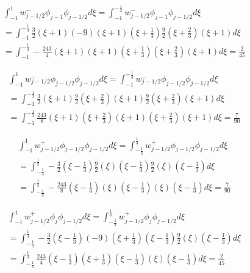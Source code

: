 \documentclass[12pt]{article}
\begin{document}
\begin{multline*}
\int_{-1}^{1} w^-_{j - 1/2} \phi_{j - 1} \phi_{j-1/2}d\xi  = \int_{-1}^{-\frac{1}{3}} w^-_{j - 1/2} \phi_{j - 1} \phi_{j-1/2}d\xi \\= \int_{-1}^{-\frac{1}{3}}  \frac{3}{2}\left(\xi + 1\right)(-9)\left(\xi + 1\right)\left(\xi + \frac{1}{3}\right) \frac{9}{2}\left(\xi + \frac{2}{3}\right)\left(\xi + 1\right) d\xi \\= \int_{-1}^{-\frac{1}{3}} -\frac{243}{4}\left(\xi + 1\right)\left(\xi + 1\right)\left(\xi + \frac{1}{3}\right)\left(\xi + \frac{2}{3}\right)\left(\xi + 1\right) d\xi  = \frac{2}{45}
\end{multline*}

\begin{multline*}
\int_{-1}^{1} w^-_{j - 1/2} \phi_{j - 1/2} \phi_{j-1/2}d\xi  = \int_{-1}^{-\frac{1}{3}} w^-_{j - 1/2} \phi_{j - 1/2} \phi_{j-1/2}d\xi \\= \int_{-1}^{-\frac{1}{3}}  \frac{3}{2}\left(\xi + 1\right)\frac{9}{2}\left(\xi + \frac{2}{3}\right)\left(\xi + 1\right) \frac{9}{2}\left(\xi + \frac{2}{3}\right)\left(\xi + 1\right) d\xi \\= \int_{-1}^{-\frac{1}{3}} \frac{243}{8}\left(\xi + 1\right)\left(\xi + \frac{2}{3}\right)\left(\xi + 1\right)\left(\xi + \frac{2}{3}\right)\left(\xi + 1\right) d\xi  = \frac{7}{90} 
\end{multline*}

\begin{multline*}
\int_{-1}^{1}w^+_{j - 1/2}\phi_{j - 1/2}\phi_{j-1/2}d\xi = \int_{-\frac{1}{3}}^{\frac{1}{3}}w^+_{j - 1/2}\phi_{j - 1/2}\phi_{j-1/2}d\xi \\ = \int_{-\frac{1}{3}}^{\frac{1}{3}}-\frac{3}{2}\left(\xi - \frac{1}{3}\right) \frac{9}{2}\left(\xi\right)\left(\xi - \frac{1}{3}\right) \frac{9}{2}\left(\xi\right)\left(\xi - \frac{1}{3}\right)d\xi \\ = \int_{-\frac{1}{3}}^{\frac{1}{3}}-\frac{243}{8}\left(\xi - \frac{1}{3}\right) \left(\xi\right)\left(\xi - \frac{1}{3}\right)\left(\xi\right)\left(\xi - \frac{1}{3}\right)d\xi = \frac{7}{90}
\end{multline*}

\begin{multline*}
\int_{-1}^{1}w^+_{j - 1/2}\phi_{j}\phi_{j-1/2}d\xi = \int_{-\frac{1}{3}}^{\frac{1}{3}}w^+_{j - 1/2}\phi_{j}\phi_{j-1/2}d\xi \\ = \int_{-\frac{1}{3}}^{\frac{1}{3}}-\frac{3}{2}\left(\xi - \frac{1}{3}\right) (-9)\left(\xi + \frac{1}{3}\right)\left(\xi - \frac{1}{3}\right) \frac{9}{2}\left(\xi\right)\left(\xi - \frac{1}{3}\right)d\xi \\ = \int_{-\frac{1}{3}}^{\frac{1}{3}}\frac{243}{4}\left(\xi - \frac{1}{3}\right) \left(\xi + \frac{1}{3}\right)\left(\xi - \frac{1}{3}\right)\left(\xi\right)\left(\xi - \frac{1}{3}\right)d\xi = \frac{2}{45}
\end{multline*}
\end{document}
